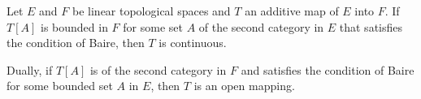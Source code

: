 Let $E$ and $F$ be linear topological spaces and $T$ an additive map of $E$ into $F$. If $T[A]$ is bounded in $F$ for some set $A$ of the second category in $E$ that satisfies the condition of Baire, then $T$ is continuous.

Dually, if $T[A]$ is of the second category in $F$ and satisfies the condition of Baire for some bounded set $A$ in $E$, then $T$ is an open mapping.
